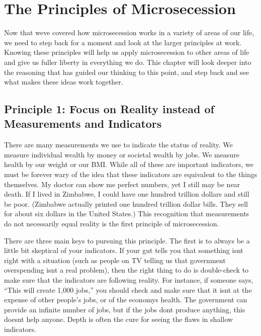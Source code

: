 \chapter{The Principles of Microsecession}

Now that we{\textquotesingle}ve covered how microsecession works in a
variety of areas of our life, we need to step back for a moment and
look at the larger principles at work. Knowing these principles will
help us apply microsecession to other areas of life and give us fuller
liberty in everything we do.  This chapter will look deeper into the
reasoning that has guided our thinking to this point, and step back and
see what makes these ideas work together.

\section{Principle 1: Focus on Reality instead of Measurements and Indicators}

There are many measurements we use to indicate the status of reality. We
measure individual wealth by money or societal wealth by jobs. We
measure health by our weight
or our BMI. While all
of these are important indicators, we must be forever wary
of the idea that
these indicators are equivalent to the things themselves. My doctor can
show me perfect numbers, yet I still may be near death. If I lived in
Zimbabwe, I could have one hundred trillion dollars and still be poor.
(Zimbabwe actually printed one hundred trillion dollar bills. They sell
for about six dollars in the United States.)
This recognition that
measurements do not necessarily equal reality is the first principle of
microsecession.

There are three main keys to pursuing this principle. The first is to
always be a little bit skeptical of your indicators. If your gut tells
you that something isn{\textquotesingle}t right with a situation (such
as people on TV telling us that government overspending
isn{\textquotesingle}t a real problem), then the right thing to do is
double-check to make sure that the indicators are following reality.
For instance, if someone says, “This will create 1,000 jobs,” you
should check and make sure that it isn{\textquotesingle}t at the
expense of other people’s jobs, or of the economy{\textquotesingle}s
health. The government can provide an infinite number of jobs, but if
the jobs
don{\textquotesingle}t produce anything, this doesn{\textquotesingle}t
help anyone. Depth is often the cure for seeing the flaws in shallow
indicators.

